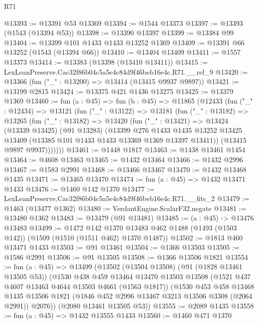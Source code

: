 \begin{lexlean}{R71}
\begin{coremodule}
@13393 := @13391 @53 @13369
@13394 := @1544 @13373
@13397 := @13393 (@1543 (@13394 @53))
@13398 := @13390 @13397
@13399 := @13384 @99
@13404 := @13399 @101 @1433 @1433 @13252 @1369
@13409 := @13391 @66 @13252 (@1543 (@13394 @66))
@13410 := @13404 @13409
@13411 := @1557 @13373
@13414 := @13383 (@13398 (@13410 @13411))
@13415 := LexLeanPreserve.Cac32f86b04c5a5e4c84d9f46beb16e4c.R71.__rel_9
@13420 := @13366 (fun ("_" : @13200) => @13414 (@13415 @9937 @9897))
@13421 := @13199 @2815
@13424 := @13375 @421 @1436 @13275
@13425 := @13379 @1369
@13460 := fun (a : @45) =>
  fun (b : @45) =>
  @11865
    (@12433
      (fun ("_" : @12434) =>
      @13121
        (fun ("_" : @13122) =>
        @13181
          (fun ("_" : @13182) =>
          @13265
            (fun ("_" : @13182) =>
            @13420
              (fun ("_" : @13421) =>
              @13424
                (@13339 @13425)
                (@91 @13283)
                (@13399
                  @276
                  @1433
                  @1435
                  @13252
                  @13425
                  @13409
                  (@13385 @101 @1433 @1433 @13369 @1369 @13397 @13411))
                (@13415 @9897 @9937)))))))
@13461 := @1448 @1817
@13463 := @1438 @13461 @1454
@13464 := @4608 @13463
@13465 := @1432 @13464
@13466 := @1432 @2996
@13467 := @1583 @2991
@13468 := @13466 @13467
@13470 := @1432 @13468 @1435
@13471 := @13465 @13470
@13474 := fun (a : @45) => @1432 @13471 @1433
@13476 := @1460 @142 @1370
@13477 := LexLeanPreserve.Cac32f86b04c5a5e4c84d9f46beb16e4c.R71.__fits_2
@13479 := @1463 (@13477 @1362)
@13480 := VerdantEngine.ScalarF32.negate
@13481 := @13480 @1362
@13483 := @13479 (@91 @13481)
@13485 := (a : @45) -> @13476 @13483
@13499 := @1472
    @142
    @1370
    @13483
    @462
    @1488
    (@1493 (@1503 @142))
    (@1509 (@1510 (@1511 @462) @1370 @1487))
@13502 := @1813 @460 @13471 @1433
@13503 := @91 @13461
@13504 := @1366 @13503
@13505 := @1586 @2991
@13506 := @91 @13505
@13508 := @1366 @13506 @1821
@13554 := fun (a : @45) =>
  @13499
    (@13502
      (@13504 @13508)
      (@91 (@1828 @13461 @13505 @53))
      (@1530
        @438
        @459
        @13464
        @13470
        @13503
        @13508
        (@1521 @437 @4607 @13463 @4644 @13503 @4661 (@1563 @1817))
        (@1530
          @453
          @458
          @13468
          @1435
          @13506
          @1821
          (@1846 @452 @2996 @13467 @3213 @13506 @3308 (@2064 @2991))
          @2076))
      (@2080 @13461 @13505 @53))
@13555 := @2089 @1435
@13558 := fun (a : @45) => @1432 @13555 @1433
@13560 := @1460 @471 @1370

\end{coremodule}
\end{lexlean}
